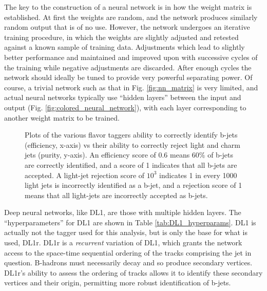             The key to the construction of a neural network is in how the weight matrix is established.
            At first the weights are random, and the network produces similarly random output that is of no use.
            However, the network undergoes an iterative training procedure, in which the weights are slightly adjusted
                and retested against a known sample of training data.
            Adjustments which lead to slightly better performance and maintained and improved upon
                with successive cycles of the training while negative adjustments are discarded.
            After enough cycles the network should ideally be tuned to provide very powerful separating power.
            Of course, a trivial network such as that in Fig. \ref{fig:nn_matrix} is very limited,
                and actual neural networks typically use ``hidden layers'' between the input and output (Fig. \ref{fig:colored_neural_network}),
                with each layer corresponding to another weight matrix to be trained.

            \begin{figure}
                \caption{
                    Plots of the various flavor taggers ability to correctly identify b-jets (efficiency, x-axis)
                        vs their ability to correctly reject light and charm jets (purity, y-axis).
                    An efficiency score of 0.6 means 60\% of b-jets are correctly identified,
                        and a score of 1 indicates that all b-jets are accepted.
                    A light-jet rejection score of $10^3$ indicates 1 in every 1000 light jets is incorrectly identified as a b-jet,
                        and a rejection score of 1 means that all light-jets are incorrectly accepted as b-jets\cite{bjet_id_and_performance}.
                }
                \label{fig:ip3d_sign}
            \end{figure}


            Deep neural networks, like DL1, are those with multiple hidden layers.
            The ``hyperparameters'' for DL1 are shown in Table \ref{tab:DL1_hyperparams}.
            DL1 is actually not the tagger used for this analysis, but is only the base for what is used, DL1r.
            DL1r is a \textit{recurrent} variation of DL1, which grants the network access to the space-time sequential
                ordering of the tracks comprising the jet in question.
            B-hadrons must necessarily decay and so produce secondary vertices.
            DL1r's ability to assess the ordering of tracks allows it to identify these secondary vertices and their origin,
                permitting more robust identification of b-jets.

